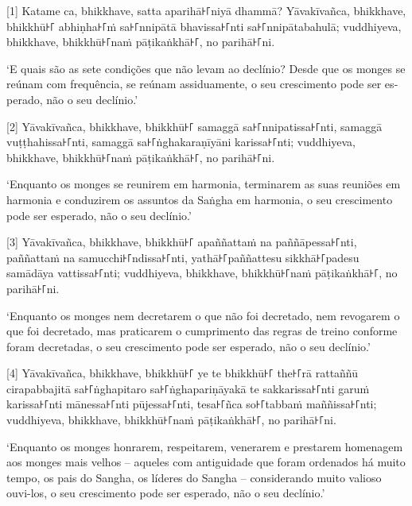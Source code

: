 [1] Katame ca, bhikkhave, satta aparihā꜔꜒niyā dhammā? Yāvakīvañca, bhikkhave, bhikkhū꜔꜒
abhiṇha꜔꜒ṁ sa꜔꜒nnipātā bhavissa꜔꜒nti sa꜔꜒nnipātabahulā; vuddhiyeva, bhikkhave,
bhikkhū꜔꜒naṁ pāṭikaṅkhā꜔꜒, no parihā꜔꜒ni.

\begin{english}
  `E quais são as sete condições que não levam ao declínio? Desde que os monges
  se reúnam com frequência, se reúnam assiduamente, o seu crescimento pode ser
  esperado, não o seu declínio.'

\end{english}

[2] Yāvakīvañca, bhikkhave, bhikkhū꜔꜒ samaggā sa꜔꜒nnipatissa꜔꜒nti, samaggā
vuṭṭhahissa꜔꜒nti, samaggā sa꜔꜒ṅghakaraṇīyāni karissa꜔꜒nti; vuddhiyeva, bhikkhave,
bhikkhū꜔꜒naṁ pāṭikaṅkhā꜔꜒, no parihā꜔꜒ni.

\begin{english}
  `Enquanto os monges se reunirem em harmonia, terminarem as suas reuniões em
  harmonia e conduzirem os assuntos da Saṅgha em harmonia, o seu crescimento
  pode ser esperado, não o seu declínio.'
\end{english}

[3] Yāvakīvañca, bhikkhave, bhikkhū꜔꜒ apaññattaṁ na paññāpessa꜔꜒nti, paññattaṁ na
samucchi꜔꜒ndissa꜔꜒nti, yathā꜔꜒paññattesu sikkhā꜔꜒padesu samādāya vattissa꜔꜒nti;
vuddhiyeva, bhikkhave, bhikkhū꜔꜒naṁ pāṭikaṅkhā꜔꜒, no parihā꜔꜒ni.

\begin{english}
  `Enquanto os monges nem decretarem o que não foi decretado, nem revogarem o que
  foi decretado, mas praticarem o cumprimento das regras de treino conforme
  foram decretadas, o seu crescimento pode ser esperado, não o seu declínio.'
\end{english}

[4] Yāvakīvañca, bhikkhave, bhikkhū꜔꜒ ye te bhikkhū꜔꜒ the꜔꜒rā rattaññū cirapabbajitā
sa꜔꜒ṅghapitaro sa꜔꜒ṅghapariṇāyakā te sakkarissa꜔꜒nti garuṁ karissa꜔꜒nti mānessa꜔꜒nti
pūjessa꜔꜒nti, tesa꜔꜒ñca so꜔꜒tabbaṁ maññissa꜔꜒nti; vuddhiyeva, bhikkhave, bhikkhū꜔꜒naṁ
pāṭikaṅkhā꜔꜒, no parihā꜔꜒ni.

\begin{english}
  `Enquanto os monges honrarem, respeitarem, venerarem e prestarem homenagem aos
  monges mais velhos -- aqueles com antiguidade que foram ordenados há muito
  tempo, os pais do Sangha, os líderes do Sangha -- considerando muito valioso
  ouvi-los, o seu crescimento pode ser esperado, não o seu declínio.'
\end{english}

